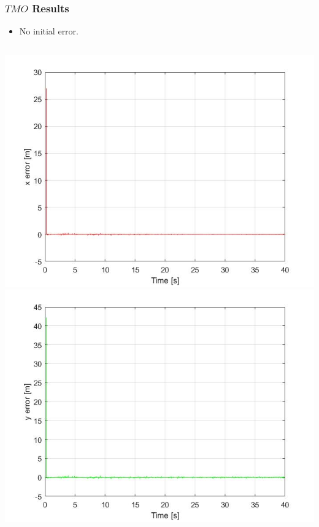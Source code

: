 \documentclass{beamer}
\begin{document}
	
	\begin{frame}
	\frametitle{$TMO$ Results}
	\begin{itemize}
		\item No initial error.
	\end{itemize}
		\begin{columns}[t]
			\centering
			\includegraphics[scale=0.18]{nlo_x_0}\\
			\includegraphics[scale=0.18]{nlo_y_0}
			\centering

\end{columns}
\end{frame}
\end{document}
